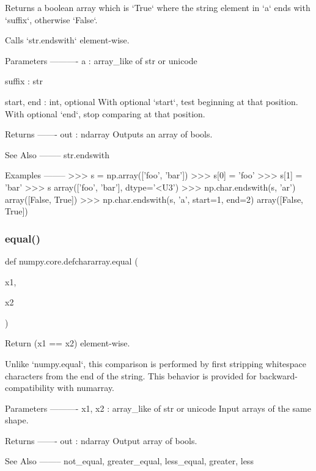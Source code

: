 \begin{DoxyVerb}Returns a boolean array which is `True` where the string element
in `a` ends with `suffix`, otherwise `False`.

Calls `str.endswith` element-wise.

Parameters
----------
a : array_like of str or unicode

suffix : str

start, end : int, optional
    With optional `start`, test beginning at that position. With
    optional `end`, stop comparing at that position.

Returns
-------
out : ndarray
    Outputs an array of bools.

See Also
--------
str.endswith

Examples
--------
>>> s = np.array(['foo', 'bar'])
>>> s[0] = 'foo'
>>> s[1] = 'bar'
>>> s
array(['foo', 'bar'], dtype='<U3')
>>> np.char.endswith(s, 'ar')
array([False,  True])
>>> np.char.endswith(s, 'a', start=1, end=2)
array([False,  True])\end{DoxyVerb}
 \mbox{\label{namespacenumpy_1_1core_1_1defchararray_a11e82151823b58f711c3238b64d172a1}} 
\subsubsection{\texorpdfstring{equal()}{equal()}}
{\footnotesize\ttfamily def numpy.\+core.\+defchararray.\+equal (\begin{DoxyParamCaption}\item[{}]{x1,  }\item[{}]{x2 }\end{DoxyParamCaption})}

\begin{DoxyVerb}Return (x1 == x2) element-wise.

Unlike `numpy.equal`, this comparison is performed by first
stripping whitespace characters from the end of the string.  This
behavior is provided for backward-compatibility with numarray.

Parameters
----------
x1, x2 : array_like of str or unicode
    Input arrays of the same shape.

Returns
-------
out : ndarray
    Output array of bools.

See Also
--------
not_equal, greater_equal, less_equal, greater, less
\end{DoxyVerb}
 \mbox{\label{namespacenumpy_1_1core_1_1defchararray_aa7634cd9c3f4d7ba47d4fcbff8fa0f1d}} 
